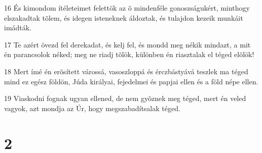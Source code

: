 \par 16 És kimondom ítéleteimet felettök az õ mindenféle gonoszságukért, minthogy elszakadtak tõlem, és idegen isteneknek áldoztak, és tulajdon kezeik munkáit imádták.
\par 17 Te azért övezd fel derekadat, és kelj fel, és mondd meg nékik mindazt, a mit én parancsolok néked; meg ne riadj tõlök, különben én riasztalak el téged elõlök!
\par 18 Mert ímé én erõsített várossá, vasoszloppá és érczbástyává teszlek ma téged mind ez egész földön, Júda királyai, fejedelmei és papjai ellen és a föld népe ellen.
\par 19 Viaskodni fognak ugyan ellened, de nem gyõznek meg téged, mert én veled vagyok, azt mondja az Úr, hogy megszabadítsalak téged.

\chapter{2}

